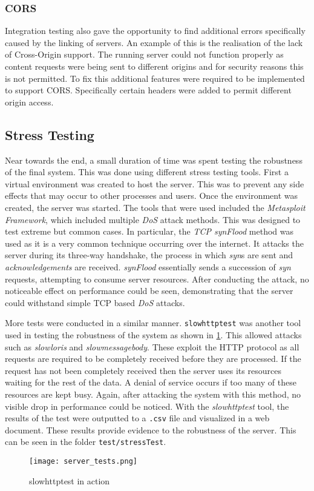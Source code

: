 \subsubsection{CORS}
Integration testing also gave the opportunity to find additional errors specifically caused by the linking of servers. An example of this is the realisation of the lack of Cross-Origin support. The running server could not function properly as content requests were being sent to different origins and for security reasons this is not permitted. To fix this additional features were required to be implemented to support CORS. Specifically certain headers were added to permit different origin access.
\subsection{Stress Testing}
Near towards the end, a small duration of time was spent testing the robustness of the final system. This was done using different stress testing tools. First a virtual environment was created to host the server. This was to prevent any side effects that may occur to other processes and users. Once the environment was created, the server was started. The tools that were used included the \textit{Metasploit Framework}, which included multiple \textit{DoS} attack methods. This was designed to test extreme but common cases. In particular, the \textit{TCP synFlood} method was used as it is a very common technique occurring over the internet. It attacks the server during its three-way handshake, the process in which \textit{syn}s are sent and \textit{acknowledgements} are received. \textit{synFlood} essentially sends a succession of \textit{syn} requests, attempting to consume server resources. After conducting the attack, no noticeable effect on performance could be seen, demonstrating that the server could withstand simple TCP based \textit{DoS} attacks. 

More tests were conducted in a similar manner. \texttt{slowhttptest} was another tool used in testing the robustness of the system as shown in \ref{fig:stress}. This allowed attacks such as \textit{slowloris} and \textit{slowmessagebody}. These exploit the HTTP protocol as all requests are required to be completely received before they are processed. If the request has not been completely received then the server uses its resources waiting for the rest of the data. A denial of service occurs if too many of these resources are kept busy. Again, after attacking the system with this method, no visible drop in performance could be noticed. With the \textit{slowhttptest} tool, the results of the test were outputted to a \texttt{.csv} file and visualized in a web document. These results provide evidence to the robustness of the server. This can be seen in the folder \texttt{test/stressTest}.

\begin{figure}[H]
	\texttt{[image: server\_tests.png]}
	\centering
	\caption{slowhttptest in action}
	\label{fig:stress}
\end{figure}